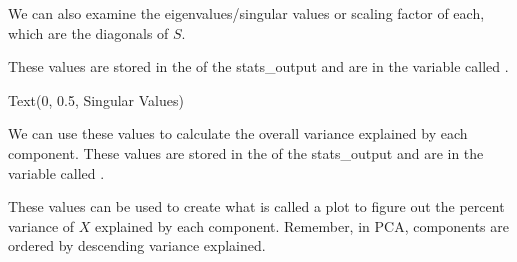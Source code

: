 \documentclass[letterpaper,10pt,english]{sphinxmanual}
\begin{document}
We can also examine the eigenvalues/singular values or scaling factor of each, which are the diagonals of \(S\).

These values are stored in the  of the stats\_output and are in the variable called .

\begin{sphinxVerbatim}[commandchars=\\\{\}]
\PYG{p}{[}\PYG{p}{]}
 
 
\end{sphinxVerbatim}

\begin{sphinxVerbatim}[commandchars=\\\{\}]
Text(0, 0.5, \PYGZsq{}Singular Values\PYGZsq{})
\end{sphinxVerbatim}

\noindent{}

We can use these values to calculate the overall variance explained by each component. These values are stored in the  of the stats\_output and are in the variable called .

These values can be used to create what is called a  plot to figure out the percent variance of \(X\) explained by each component. Remember, in PCA, components are ordered by descending variance explained.
\end{document}
